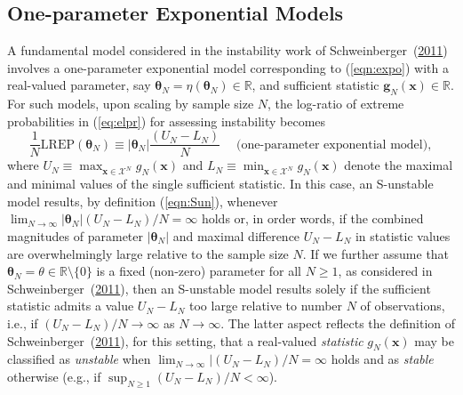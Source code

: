 \documentclass[12pt]{article}
\theoremstyle{definition}
\newcommand{\REP}{\mathrm{LREP}}
\begin{document}
\subsection{One-parameter Exponential Models}  A fundamental model considered in the instability work of Schweinberger~(\protect\hyperlink{ref-schweinberger2011instability}{2011}) involves a one-parameter exponential model corresponding to (\ref{eqn:expo}) with a real-valued parameter, say $\boldsymbol \theta_N =  \eta(\boldsymbol \theta_N)\in \mathbb{R}$, and sufficient statistic $\boldsymbol g_N(\boldsymbol x)\in \mathbb{R}$.
For such models,  upon scaling by sample size $N$, the log-ratio of extreme probabilities in (\ref{eq:elpr}) for assessing instability   becomes
 \begin{equation}
 \label{eq:UL}
  \frac{1}{N}\REP(\boldsymbol \theta_N ) \equiv   |\boldsymbol \theta_N| \frac{(U_N-L_N)}{N} \;\quad \mbox{(one-parameter exponential model)},
 \end{equation}
  where $U_N \equiv \max_{\boldsymbol x\in\mathcal{X}^N}g_N(\boldsymbol x)$  and $L_N \equiv \min_{\boldsymbol x\in\mathcal{X}^N}g_N(\boldsymbol x)$ denote the maximal and minimal values of the single sufficient statistic.
    In this case, an S-unstable model results, by definition (\ref{eqn:Sun}), whenever
  $\lim_{N\to \infty} |\boldsymbol \theta_N| (U_N-L_N)/N= \infty$ holds or, in order words, if the combined  magnitudes of parameter $|\boldsymbol \theta_N|$ and maximal difference $U_N-L_N$ in statistic values are overwhelmingly large relative to the sample size $N$.
  If we further assume that
   $\boldsymbol \theta_N =\theta\in\mathbb{R}\setminus \{0\}$ is a fixed (non-zero) parameter for all $N \geq 1$,  as considered in Schweinberger~(\protect\hyperlink{ref-schweinberger2011instability}{2011}), then an S-unstable model  results solely if the sufficient statistic admits a value   $ U_N-L_N $ too large relative to number $N$ of observations, i.e.,  if  $(U_N-L_N)/N\to \infty$ as $N\to \infty$.  The latter aspect reflects the definition of Schweinberger~(\protect\hyperlink{ref-schweinberger2011instability}{2011}), for this setting, that a real-valued {\it statistic} $g_N(\boldsymbol x)$ may be classified as  {\it unstable} when  $\lim_{N\to \infty}|(U_N-L_N)/N=\infty$ holds and as {\it stable} otherwise (e.g., if $\sup_{N \geq 1}(U_N-L_N)/N<\infty$).
\end{document}
